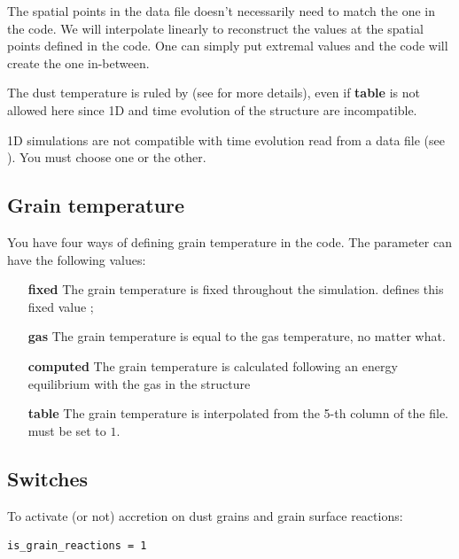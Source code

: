 \documentclass[english,a4paper,twoside]{article}
\begin{document}
The spatial points in the data file doesn't necessarily need to match the one in the code. We will interpolate linearly to reconstruct the values at the spatial points defined in the code. One can simply put extremal values and the code will create the one in-between. 

The dust temperature is ruled by  (see  for more details), even if \textbf{table} is not allowed here since 1D and time evolution of the structure are incompatible.

\begin{attention}
1D simulations are not compatible with time evolution read from a data file (see ). You must choose one or the other.
\end{attention}

\subsection{Grain temperature}\label{sec:dust_temp}
You have four ways of defining grain temperature in the code. The parameter  can have the following values:
\begin{itemize}
\item[\textbf{fixed}] The grain temperature is fixed throughout the simulation.  defines this fixed value ;
\item[\textbf{gas}] The grain temperature is equal to the gas temperature, no matter what.
\item[\textbf{computed}] The grain temperature is calculated following an energy equilibrium with the gas in the structure
\item[\textbf{table}] The grain temperature is interpolated from the 5-th column of the   file.  must be set to $1$.
\end{itemize}

\subsection{Switches}
To activate (or not) accretion on dust grains and grain surface reactions:
\begin{verbatim}
is_grain_reactions = 1
\end{verbatim}
\end{document}
